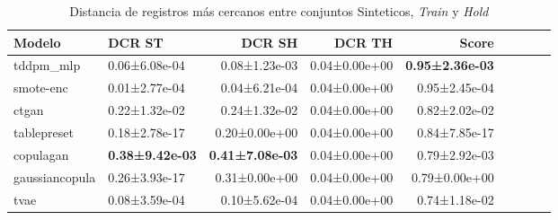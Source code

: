 \begin{table}[H]
\centering
\fontsize{10}{14}\selectfont
\caption{Distancia de registros más cercanos entre conjuntos Sinteticos, \emph{Train} y \emph{Hold}}
\label{table-dcr-king county-a}
\begin{tabular}{|l|l|r|r|r|r|r|r|r|}
\hline
\rowcolor[gray]{0.8}
Modelo & DCR ST & DCR SH & DCR TH & \textbf{Score} \\
\hline tddpm\_mlp & 0.06±6.08e-04 & 0.08±1.23e-03 & 0.04±0.00e+00 & \bfseries 0.95±2.36e-03 \\
\hline smote-enc & \cellcolor[rgb]{0.9, 0.54, 0.52} 0.01±2.77e-04 & \cellcolor[rgb]{0.9, 0.54, 0.52} 0.04±6.21e-04 & 0.04±0.00e+00 & 0.95±2.45e-04 \\
\hline ctgan & 0.22±1.32e-02 & 0.24±1.32e-02 & 0.04±0.00e+00 & 0.82±2.02e-02 \\
\hline tablepreset & 0.18±2.78e-17 & 0.20±0.00e+00 & 0.04±0.00e+00 & 0.84±7.85e-17 \\
\hline copulagan & \bfseries 0.38±9.42e-03 & \bfseries 0.41±7.08e-03 & 0.04±0.00e+00 & 0.79±2.92e-03 \\
\hline gaussiancopula & 0.26±3.93e-17 & 0.31±0.00e+00 & 0.04±0.00e+00 & 0.79±0.00e+00 \\
\hline tvae & 0.08±3.59e-04 & 0.10±5.62e-04 & 0.04±0.00e+00 & \cellcolor[rgb]{0.9, 0.54, 0.52} 0.74±1.18e-02 \\
\hline
\end{tabular}
\end{table}
